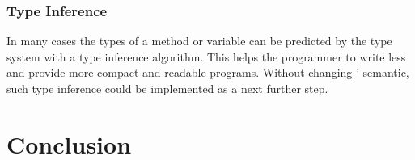 \subsubsection{Type Inference}
In many cases the types of a method or variable can be predicted
by the type system with a type inference algorithm. This helps
the programmer to write less and provide more compact and readable
programs. Without changing \ooplss' semantic, such type inference
could be implemented as a next further step.

\section{Conclusion}
\label{ctr:conclusion}
